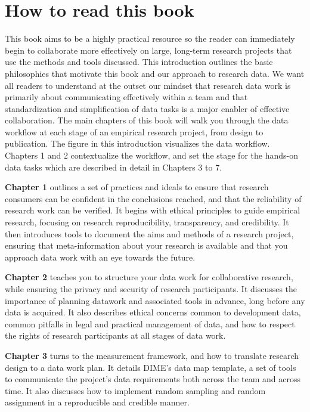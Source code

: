 
\section{How to read this book}
This book aims to be a highly practical resource so the reader can
immediately begin to collaborate more effectively
on large, long-term research projects
that use the methods and tools discussed.
This introduction outlines the basic philosophies
that motivate this book and our approach to research data.
We want all readers to understand at the outset our mindset
that research data work is primarily about
communicating effectively within a team
and that standardization and simplification of data tasks
is a major enabler of effective collaboration.
The main chapters of this book will walk you through the data workflow at each stage
of an empirical research project, from design to publication.
The figure in this introduction visualizes the data workflow.
Chapters 1 and 2 contextualize the workflow,
and set the stage for the hands-on data tasks
which are described in detail in Chapters 3 to 7.

\textbf{Chapter 1} outlines a set of practices and ideals to ensure that
research consumers can be confident in the conclusions reached,
and that the reliability of research work can be verified.
It begins with ethical principles to guide empirical research,
focusing on research reproducibility, transparency, and credibility.
It then introduces tools to document
the aims and methods of a research project,
ensuring that meta-information about your research is available
and that you approach data work with an eye towards the future.

\textbf{Chapter 2} teaches you to structure your data work for collaborative research,
while ensuring the privacy and security of research participants.
It discusses the importance of planning datawork and associated tools in advance,
long before any data is acquired.
It also describes ethical concerns common to development data,
common pitfalls in legal and practical management of data,
and how to respect the rights of research participants at all stages of data work.

\textbf{Chapter 3} turns to the measurement framework,
and how to translate research design to a data work plan.
It details DIME's data map template, a set of tools to communicate the project's data requirements
both across the team and across time.
It also discusses how to implement random sampling and random assignment
in a reproducible and credible manner.

